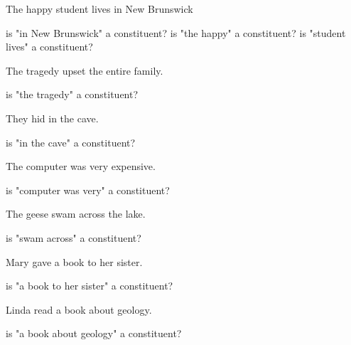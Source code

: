 \documentclass[a4paper,11pt]{article}
\begin{document}
\begin{exe}
\ex The happy student lives in New Brunswick \begin{xlist}
	\ex is "in New Brunswick" a constituent?
	\ex is "the happy" a constituent? 
	\ex is "student lives" a constituent?
\end{xlist}
\vspace{4cm}
\ex The tragedy upset the entire family. \begin{xlist}
	\ex is "the tragedy" a constituent?
\end{xlist}
\pagebreak
\ex They hid in the cave. \begin{xlist}
	\ex is "in the cave" a constituent? 
\end{xlist}
\vspace{3cm}
\ex The computer was very expensive. \begin{xlist}
	\ex is "computer was very" a constituent?
\end{xlist}
\vspace{3cm}
\ex The geese swam across the lake. \begin{xlist}
	\ex is "swam across" a constituent? 
\end{xlist}
\vspace{3cm}
\ex Mary gave a book to her sister. \begin{xlist}
	\ex is "a book to her sister" a constituent?
\end{xlist}
\vspace{3cm}
\ex Linda read a book about geology. \begin{xlist}
	\ex is "a book about geology" a constituent?
\end{xlist}
\end{exe}
\end{document}
